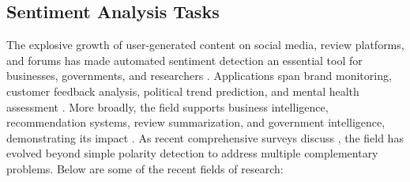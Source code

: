 \documentclass[a4paper,twoside,12pt]{book}
\begin{document}
\subsection{Sentiment Analysis Tasks}

The explosive growth of user-generated content on social media, review platforms, and forums has made automated sentiment detection an essential tool for businesses, governments, and researchers \cite{sharma2025review}. Applications span brand monitoring, customer feedback analysis, political trend prediction, and mental health assessment \cite{sharma2025review}. More broadly, the field supports business intelligence, recommendation systems, review summarization, and government intelligence, demonstrating its impact \cite{behdenna2018document}. As recent comprehensive surveys discuss \cite{sharma2025review}, the field has evolved beyond simple polarity detection to address multiple complementary problems. Below are some of the recent fields of research:
\end{document}
